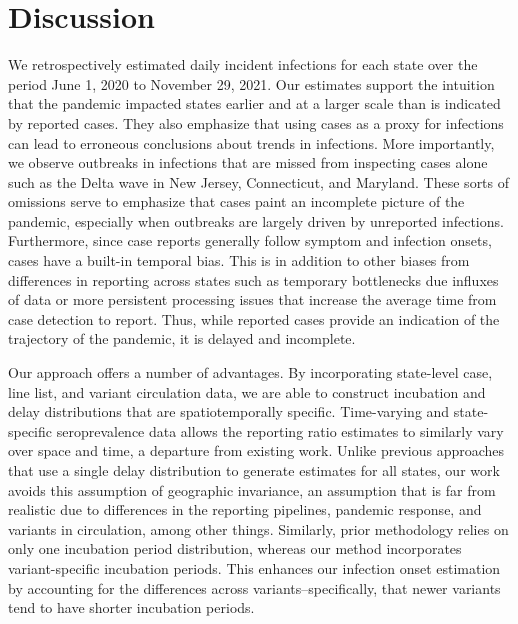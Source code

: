 \section{Discussion}

We retrospectively estimated daily incident infections for each \US state over
the period June 1, 2020 to November 29, 2021. Our estimates support the
intuition that the pandemic impacted states earlier and at a larger scale
than is indicated by reported cases. They also emphasize that using cases as a
proxy for infections can lead to erroneous conclusions about trends in infections.
More importantly, we observe outbreaks in infections that are missed from
inspecting cases alone such as the Delta wave in 
New Jersey, Connecticut, and Maryland.
These sorts of omissions serve to emphasize that cases paint an incomplete
picture of the pandemic, especially when outbreaks are largely driven by
unreported infections. Furthermore, since case reports generally follow symptom
and infection onsets, cases have a built-in temporal bias. This is in addition
to other biases from differences in reporting across states such as temporary
bottlenecks due influxes of data or more persistent processing issues that
increase the average time from case detection to report. \citep{wash2020dash,
dunkel2020covid19} Thus, while reported cases provide an indication of the
trajectory of the pandemic, it is delayed and incomplete.

Our approach offers a number of advantages. By incorporating state-level case,
line list, and variant circulation data, we are able to construct incubation and
delay distributions that are spatiotemporally specific. Time-varying and
state-specific seroprevalence data allows the reporting ratio estimates to
similarly vary over space and time, a departure from existing work.
\citep{unwin2020state, uga2020covid19} Unlike previous approaches that use a
single delay distribution to generate estimates for all states,
\citep{chitwood2022reconstructing, jahja2022real, miller2022statistical} our
work avoids this assumption of geographic invariance, an assumption that is far
from realistic due to differences in the reporting pipelines, pandemic response,
and variants in circulation, among other things. Similarly, prior methodology
relies on only one incubation period distribution, \citep{miller2022statistical}
whereas our method incorporates variant-specific incubation periods. This
enhances our infection onset estimation by accounting for the differences across
variants--specifically, that newer variants tend to have shorter incubation
periods. \citep{tanaka2022shorter, ogata2022shorter, wu2022incubation}

